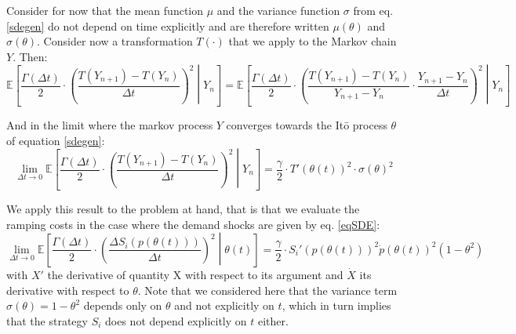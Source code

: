 
Consider for now that the mean function $\mu$ and the variance function $\sigma$ from eq. \ref{sdegen} do not depend on time explicitly and are therefore written $\mu(\theta)$ and $\sigma(\theta)$. Consider now a transformation $T(\cdot)$ that we apply to the Markov chain $Y$. Then:
\begin{equation}
\mathbb{E}\left[\frac{\Gamma(\Delta t)}{2}\cdot\left(\frac{T(Y_{n+1})-T(Y_n)}{\Delta t}\right)^2\middle \vert Y_n  \right]= \mathbb{E}\left[\frac{\Gamma(\Delta t)}{2}\cdot\left(\frac{T(Y_{n+1})-T(Y_n)}{Y_{n+1}-Y_n}\cdot\frac{Y_{n+1}-Y_n}{\Delta t}\right)^2\middle \vert Y_n  \right]    
\label{markovcomposed}
\end{equation}

And in the limit where the markov process $Y$ converges towards the It\={o} process $\theta$ of equation \ref{sdegen}:
\begin{equation}
\lim_{\Delta t \to 0}\mathbb{E}\left[\frac{\Gamma(\Delta t)}{2}\cdot\left(\frac{T(Y_{n+1})-T(Y_n)}{\Delta t}\right)^2\middle \vert Y_n  \right]= \frac{\gamma}{2}\cdot T'(\theta(t))^2 \cdot \sigma(\theta) ^2   
\label{limitmarkovcomposed}
\end{equation}

We apply this result to the problem at hand, that is that we evaluate the ramping costs in the case where the demand shocks are given by eq. \ref{eqSDE}: 
\begin{equation}
\lim_{\Delta t \to 0}\mathbb{E}\left[\frac{\Gamma(\Delta t)}{2}\cdot\left(\frac{\Delta S_i(p(\theta(t)))}{\Delta t}\right)^2\middle \vert \theta(t)  \right] = \frac{\gamma}{2}\cdot S_i'(p(\theta(t)))^2\dot{p}(\theta(t))^2 (1-\theta^2)
\label{markovtosde}
\end{equation}
with $X'$ the derivative of quantity X with respect to its argument and $\dot{X}$ its derivative with respect to $\theta$. Note that we considered here that the variance term $\sigma(\theta)=1-\theta^2$ depends only on $\theta$ and not explicitly on $t$, which in turn implies that the strategy $S_i$ does not depend explicitly on $t$ either. \\

